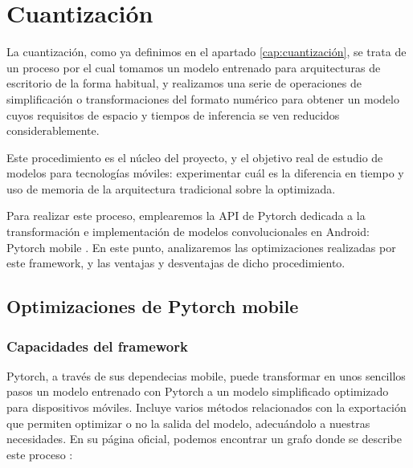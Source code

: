 \chapter{Cuantización}

La cuantización, como ya definimos en el apartado \ref{cap:cuantización}, se trata de un proceso por el cual tomamos un modelo entrenado para arquitecturas de escritorio de la forma habitual, y realizamos una serie de operaciones de simplificación o transformaciones del formato numérico para obtener un modelo cuyos requisitos de espacio y tiempos de inferencia se ven reducidos considerablemente. 

Este procedimiento es el núcleo del proyecto, y el objetivo real de estudio de modelos para tecnologías móviles: experimentar cuál es la diferencia en tiempo y uso de memoria de la arquitectura tradicional sobre la optimizada.

Para realizar este proceso, emplearemos la API de Pytorch dedicada a la transformación e implementación de modelos convolucionales en Android: Pytorch mobile  \cite{pmobile}. En este punto, analizaremos las optimizaciones realizadas por este framework, y las ventajas y desventajas de dicho procedimiento.

\section{Optimizaciones de Pytorch mobile}
\subsection{Capacidades del framework}
Pytorch, a través de sus dependecias mobile, puede transformar en unos sencillos pasos un modelo entrenado con Pytorch a un modelo simplificado optimizado para dispositivos móviles. Incluye varios métodos relacionados con la exportación que permiten optimizar o no la salida del modelo, adecuándolo a nuestras necesidades. En su página oficial, podemos encontrar un grafo donde se describe este proceso \cite{pmobile}:

